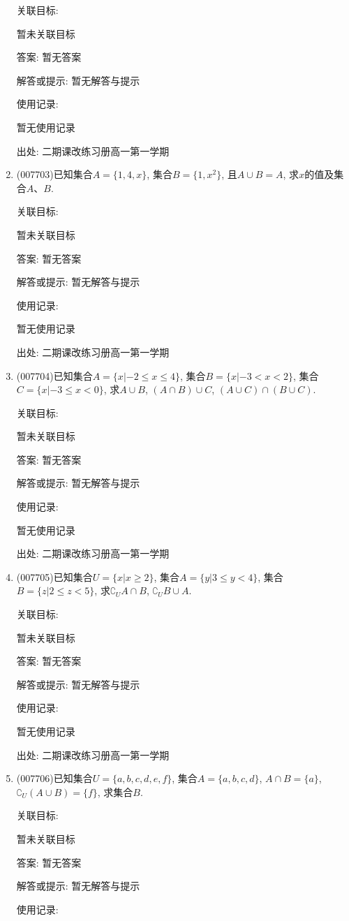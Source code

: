 \documentclass[10pt,a4paper]{article}
\begin{document}
\begin{enumerate}[1.]
关联目标:

暂未关联目标

答案: 暂无答案

解答或提示: 暂无解答与提示

使用记录:

暂无使用记录


出处: 二期课改练习册高一第一学期
\item { (007703)}已知集合$A=\{1,4,x\}$, 集合$B=\{1,x^2\}$, 且$A\cup B=A$, 求$x$的值及集合$A$、$B$.


关联目标:

暂未关联目标

答案: 暂无答案

解答或提示: 暂无解答与提示

使用记录:

暂无使用记录


出处: 二期课改练习册高一第一学期
\item { (007704)}已知集合$A=\{x|-2\le x\le 4\}$, 集合$B=\{x|-3<x<2\}$, 集合$C=\{x|-3\le x<0\}$, 求$A\cup B$, $(A\cap B)\cup C$, $(A\cup C)\cap (B\cup C)$.


关联目标:

暂未关联目标

答案: 暂无答案

解答或提示: 暂无解答与提示

使用记录:

暂无使用记录


出处: 二期课改练习册高一第一学期
\item { (007705)}已知集合$U=\{x|x\ge 2\}$, 集合$A=\{y|3\le y<4\}$, 集合$B=\{z|2\le z<5\}$, 求$\complement _UA\cap B$, $\complement _UB\cup A$.


关联目标:

暂未关联目标

答案: 暂无答案

解答或提示: 暂无解答与提示

使用记录:

暂无使用记录


出处: 二期课改练习册高一第一学期
\item { (007706)}已知集合$U=\{a,b,c,d,e,f\}$, 集合$A=\{a,b,c,d\}$, $A\cap B=\{a\}$, $\complement _U(A\cup B)=\{f\}$, 求集合$B$.


关联目标:

暂未关联目标

答案: 暂无答案

解答或提示: 暂无解答与提示

使用记录:


\end{enumerate}
\end{document}

